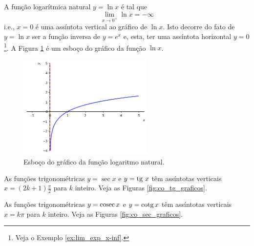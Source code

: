 \cleardoublepage\documentclass[../main.tex]{subfiles}
\begin{document}
\begin{ex}
  A função logarítmica natural $y = \ln x$ é tal que
  \begin{equation*}
    \lim_{x\to 0^+} \ln x = -\infty
  \end{equation*}
  i.e., $x=0$ é uma assíntota vertical ao gráfico de $\ln x$. Isto decorre do fato de $y = \ln x$ ser a função inversa de $y = e^x$ e, esta, ter uma assíntota horizontal $y=0$\footnote{Veja o Exemplo \ref{ex:lim_exp_x-inf}.}. A Figura \ref{fig:ex_lim_assvert_lnx} é um esboço do gráfico da função  $\ln x$.

    \begin{figure}[H]
      \centering
      \includegraphics[width=0.6\textwidth]{fig_lim/fig_ex_lim_assvert_lnx}
      \caption{Esboço do gráfico da função logaritmo natural.}
      \label{fig:ex_lim_assvert_lnx}
    \end{figure}  
\end{ex}

\begin{ex}
  As funções trigonométricas $y = \sec x$ e $\displaystyle y = \operatorname{tg}\, x$ têm assíntotas verticais $x = (2k+1)\frac{\pi}{2}$ para $k$ inteiro. Veja as Figuras \ref{fig:co_tg_graficos}.
\end{ex}

\begin{ex}
  As funções trigonométricas $y = \operatorname{cosec} x$ e $\displaystyle y = \operatorname{cotg} x$ têm assíntotas verticais $x = k\pi$ para $k$ inteiro. Veja as Figuras \ref{fig:co_sec_graficos}.
\end{ex}
\end{document}
